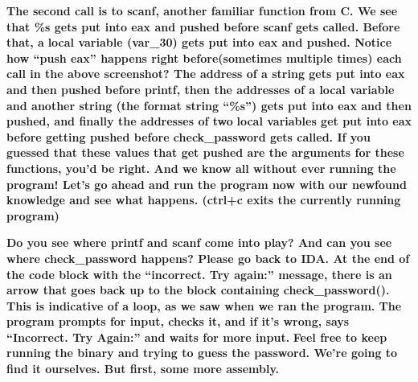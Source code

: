   
 \textbf{\newline
The second call is to scanf, another familiar function from C. We see that \%s gets put into eax and pushed before scanf
gets called. Before that, a }\textbf{\textcolor[rgb]{0.21960784,0.4627451,0.11372549}{local variable
}}\textbf{(var\_30) gets put into eax and pushed. Notice how ``push eax'' happens right before(sometimes multiple
times) each call in the above screenshot? The address of a string gets put into eax and then pushed before printf, then
the addresses of a local variable and another string (the format string ``\%s'') gets put into eax and then pushed, and
finally the addresses of two }\textbf{\textcolor[rgb]{0.21960784,0.4627451,0.11372549}{local variables }}\textbf{get
put into eax before getting pushed before check\_password gets called. If you guessed that these values that get pushed
are the arguments for these functions, you'd be right. And we know all without ever running the program! Let's go ahead
and run the program now with our newfound knowledge and see what happens. (ctrl+c exits the currently running
program)\newline
}  
 

\textbf{Do you see where printf and scanf come into play? And can you see where check\_password happens? Please go back
to IDA. At the end of the code block with the ``incorrect. Try again:'' message, there is an arrow that goes back up to
the block containing check\_password(). This is indicative of a loop, as we saw when we ran the program. The program
prompts for input, checks it, and if it's wrong, says ``Incorrect. Try Again:'' and waits for more input.  }
 \textbf{\newline
Feel free to keep running the binary and trying to guess the password. We're going to find it ourselves. But first, some
more assembly. \newline
}

